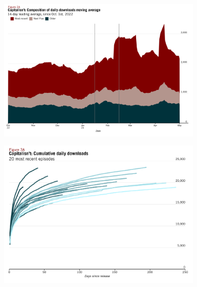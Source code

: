\documentclass[11pt, letterpaper, twoside]{article}
\begin{document}
\begin{figure}[!htbp]
  \centering
  \includegraphics[width=0.9\textwidth]{figures/recent_podcast_moving_avg_decomp.png}
  \caption{}
  \label{fig:recent_moving_avg_perf_decomp}
\end{figure}

\begin{figure}[!htb]
  \centering
  \includegraphics[width=0.9\textwidth]{figures/recent_20_episodes_cumul_perf.png}
  \caption{}
  \label{fig:recent_20_cumul_perf}
\end{figure}
\end{document}
